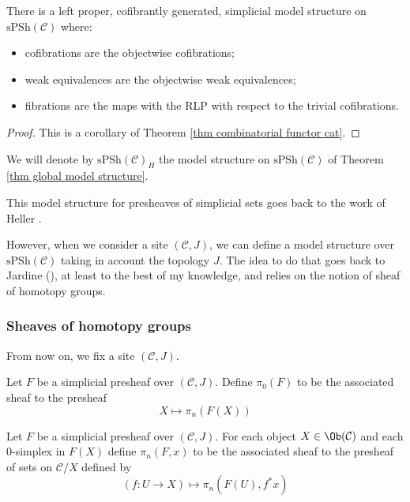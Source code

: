 \begin{thm} \label{thm global model structure}
There is a left proper, cofibrantly generated, simplicial model structure on $\mathrm{sPSh}(\mathcal C)$ where:
\begin{itemize}
\item cofibrations are the objectwise cofibrations;
\item weak equivalences are the objectwise weak equivalences;
\item fibrations are the maps with the RLP with respect to the trivial cofibrations.
\end{itemize}
\end{thm}

\begin{proof}
This is a corollary of Theorem \ref{thm combinatorial functor cat}.
\end{proof}

We will denote by $\mathrm{sPSh}(\mathcal C)_H$ the model structure on $\mathrm{sPSh}(\mathcal C)$ of Theorem \ref{thm global model structure}.

\begin{rmk}
This model structure for presheaves of simplicial sets goes back to the work of Heller .
\end{rmk}

However, when we consider a site $(\mathcal C, J)$, we can define a model structure over $\mathrm{sPSh}(\mathcal C)$ taking in account the topology $J$. The idea to do that goes back to Jardine (), at least to the best of my knowledge, and relies on the notion of sheaf of homotopy groups.

\subsubsection{Sheaves of homotopy groups}

From now on, we fix a site $(\mathcal C, J)$.

\begin{defin}
Let $F$ be a simplicial presheaf over $(\mathcal C,J)$. Define $\pi_0(F)$ to be the associated sheaf to the presheaf
\[
X \mapsto \pi_n(F(X))
\]
\end{defin}

\begin{defin}
Let $F$ be a simplicial presheaf over $(\mathcal C,J)$. For each object $X \in \Ob(\mathcal C)$ and each $0$-simplex in $F(X)$ define $\pi_n(F,x)$ to be the associated sheaf to the presheaf of sets on $\mathcal C / X$ defined by
\[
(f \colon U \to X) \mapsto \pi_n(F(U),f^*x)
\]
\end{defin}

